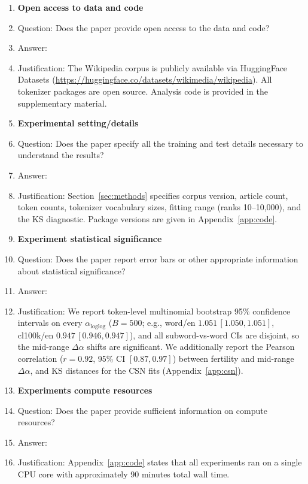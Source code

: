 \documentclass{article}
\begin{document}
\begin{enumerate}
\item {\bf Open access to data and code}
    \item[] Question: Does the paper provide open access to the data and code?
    \item[] Answer: \answerYes{}
    \item[] Justification: The Wikipedia corpus is publicly available via HuggingFace Datasets (\url{https://huggingface.co/datasets/wikimedia/wikipedia}). All tokenizer packages are open source. Analysis code is provided in the supplementary material.

\item {\bf Experimental setting/details}
    \item[] Question: Does the paper specify all the training and test details necessary to understand the results?
    \item[] Answer: \answerYes{}
    \item[] Justification: Section~\ref{sec:methods} specifies corpus version, article count, token counts, tokenizer vocabulary sizes, fitting range (ranks 10--10,000), and the KS diagnostic. Package versions are given in Appendix~\ref{app:code}.

\item {\bf Experiment statistical significance}
    \item[] Question: Does the paper report error bars or other appropriate information about statistical significance?
    \item[] Answer: \answerYes{}
    \item[] Justification: We report token-level multinomial bootstrap 95\% confidence intervals on every $\alpha_{\text{loglog}}$ ($B = 500$; e.g., word/en $1.051\,[1.050,1.051]$, cl100k/en $0.947\,[0.946,0.947]$), and all subword-vs-word CIs are disjoint, so the mid-range $\Delta\alpha$ shifts are significant. We additionally report the Pearson correlation ($r = 0.92$, 95\% CI $[0.87, 0.97]$) between fertility and mid-range $\Delta\alpha$, and KS distances for the CSN fits (Appendix~\ref{app:csn}).

\item {\bf Experiments compute resources}
    \item[] Question: Does the paper provide sufficient information on compute resources?
    \item[] Answer: \answerYes{}
    \item[] Justification: Appendix~\ref{app:code} states that all experiments ran on a single CPU core with approximately 90 minutes total wall time.


\end{enumerate}
\end{document}
